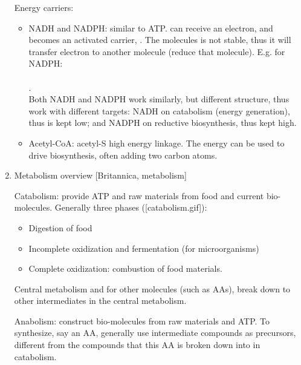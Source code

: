 \documentclass{report}
\begin{document}
\begin{enumerate}
Energy carriers: 
\begin{itemize}
	\item NADH and NADPH: similar to ATP.  can receive an electron, and becomes an activated carrier, . The  molecules is not stable, thus it will transfer electron to another molecule (reduce that molecule). E.g. for NADPH:\\
	\\
	.\\ 
	Both NADH and NADPH work similarly, but different structure, thus work with different targets: NADH on catabolism (energy generation), thus  is kept low; and NADPH on reductive biosynthesis, thus kept high. 
	\item Acetyl-CoA: acetyl-S high energy linkage. The energy can be used to drive biosynthesis, often adding two carbon atoms. 
\end{itemize}

\item{Metabolism overview}
[Britannica, metabolism]



Catabolism: provide ATP and raw materials from food and current bio-molecules. Generally three phases ([catabolism.gif]): 
\begin{itemize}
	\item Digestion of food
	\item Incomplete oxidization and fermentation (for microorganisms)
	\item Complete oxidization: combustion of food materials. 
\end{itemize}
Central metabolism and for other molecules (such as AAs), break down to other intermediates in the central metabolism. 

Anabolism: construct bio-molecules from raw materials and ATP. To synthesize, say an AA, generally use intermediate compounds as precursors, different from the compounds that this AA is broken down into in catabolism. 


\end{enumerate}
\end{document}
